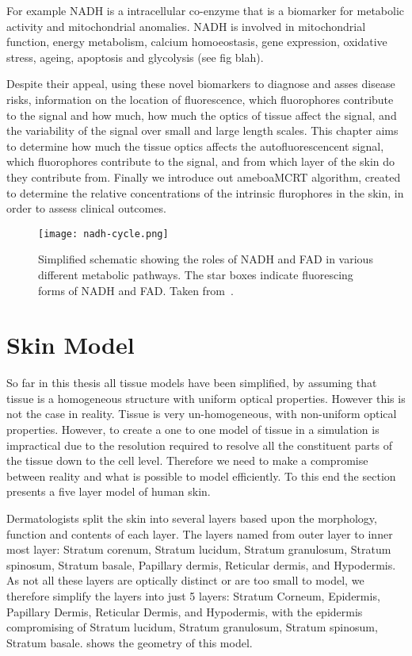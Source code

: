 For example NADH is a intracellular co-enzyme that is a biomarker for metabolic activity and mitochondrial anomalies. 
NADH is involved in mitochondrial function, energy metabolism, calcium homoeostasis, gene expression, oxidative stress, ageing, apoptosis and glycolysis (see fig blah).


Despite their appeal, using these novel biomarkers to diagnose and asses disease risks, information on the location of fluorescence, which fluorophores contribute to the signal and how much, how much the optics of tissue affect the signal, and the variability of the signal over small and large length scales.
This chapter aims to determine how much the tissue optics affects the autofluorescencent signal, which fluorophores contribute to the signal, and from which layer of the skin do they contribute from.
Finally we introduce out ameboaMCRT algorithm, created to determine the relative concentrations of the intrinsic flurophores in the skin, in order to assess clinical outcomes.


\begin{figure}[!htpb]
  \centering
  \texttt{[image: nadh-cycle.png]}
  \caption{Simplified schematic showing the roles of NADH and FAD in various different metabolic pathways. The star boxes indicate fluorescing forms of NADH and FAD. Taken from~\cite{croce2014autofluorescence}.}
  \label{fig:figure1}
\end{figure}


\FloatBarrier

\section{Skin Model}

So far in this thesis all tissue models have been simplified, by assuming that tissue is a homogeneous structure with uniform optical properties.
However this is not the case in reality.
Tissue is very un-homogeneous, with non-uniform optical properties.
However, to create a one to one model of tissue in a simulation is impractical due to the resolution required to resolve all the constituent parts of the tissue down to the cell level.
Therefore we need to make a compromise between reality and what is possible to model efficiently.
To this end the section presents a five layer model of human skin. 

Dermatologists split the skin into several layers based upon the morphology, function and contents of each layer.
The layers named from outer layer to inner most layer: Stratum corenum, Stratum lucidum, Stratum granulosum, Stratum spinosum, Stratum basale, Papillary dermis, Reticular dermis, and Hypodermis.
As not all these layers are optically distinct or are too small to model, we therefore simplify the layers into just 5 layers: Stratum Corneum, Epidermis, Papillary Dermis, Reticular Dermis, and Hypodermis, with the epidermis compromising of Stratum lucidum, Stratum granulosum, Stratum spinosum, Stratum basale. shows the geometry of this model.

